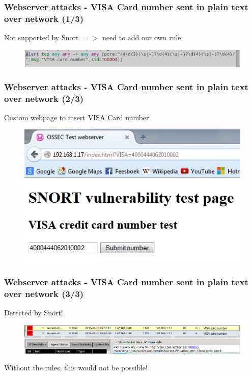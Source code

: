 \documentclass{beamer}
\begin{document}

\begin{frame}
\frametitle{Webserver attacks - VISA Card number sent in plain text over network (1/3)}
Not supported by Snort $=>$ need to add our own rule
\begin{figure}
   \includegraphics[width= 1\linewidth]{../images/VM_VISA.png}
\end{figure}
\end{frame}
\begin{frame}
\frametitle{Webserver attacks - VISA Card number sent in plain text over network (2/3)}
Custom webpage to insert VISA Card number
\begin{figure}
   \includegraphics[width= 0.6\linewidth]{../images/VM_VISA_2.png}
\end{figure}
\end{frame}
\begin{frame}
\frametitle{Webserver attacks - VISA Card number sent in plain text over network (3/3)}
Detected by Snort!
\begin{figure}
   \includegraphics[width= 1\linewidth]{../images/VM_VISA_3.png}
\end{figure}
Without the rules, this would not be possible!
\end{frame}
\end{document}
